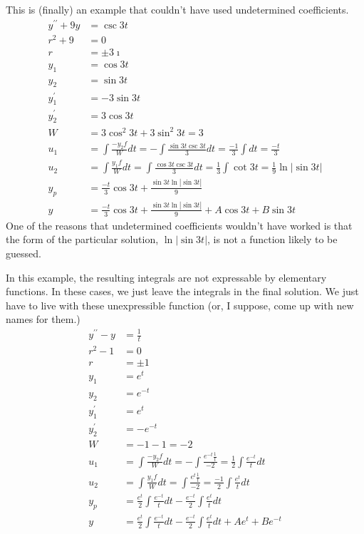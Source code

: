 \documentclass[fleqn,letterpaper]{report}
\begin{document}
\begin{example}
This is (finally) an example that couldn't have used
undetermined coefficients.
\begin{align*}
y^{\prime\prime} + 9y & = \csc 3t \\
r^2 + 9 & = 0 \\
r & = \pm 3\imath \\
y_1 & = \cos 3t \\
y_2 & = \sin 3t \\
y_1^\prime & = -3 \sin 3t \\
y_2^\prime & = 3 \cos 3t \\
W & = 3\cos^2 3t + 3 \sin^2 3t = 3\\
u_1 & = \int \frac{-y_2 f}{W} dt = -\int \frac{\sin 3t \csc
3t}{3} dt = \frac{-1}{3} \int dt = \frac{-t}{3} \\
u_2 & = \int \frac{y_1 f}{W} dt = \int \frac{\cos3t \csc 3t}{3}
dt = \frac{1}{3} \int \cot 3t = \frac{1}{9} \ln |\sin 3t| \\
y_p & = \frac{-t}{3} \cos 3t + \frac{\sin 3t \ln |\sin 3t|}{9}
\\
y & = \frac{-t}{3} \cos 3t + \frac{\sin 3t \ln |\sin 3t|}{9} + A
\cos 3t + B \sin 3t
\end{align*}
One of the reasons that undetermined coefficients wouldn't
have worked is that the form of the particular solution, $\ln
|\sin 3t|$, is not a function likely to be guessed.
\end{example}

\begin{example}
In this example, the resulting integrals are not
expressable by elementary functions. In these cases, we just
leave the integrals in the final solution. We just have to
live with these unexpressible function (or, I suppose, come up
with new names for them.) 
\begin{align*}
y^{\prime\prime} - y & = \frac{1}{t} \\
r^2 - 1 & = 0 \\
r & = \pm 1\\
y_1 & = e^t \\
y_2 & = e^{-t} \\
y_1^\prime & = e^t \\
y_2^\prime & = - e^{-t} \\ 
W & = -1 -1 = -2 \\
u_1 & = \int \frac{-y_2 f}{W} dt = -\int \frac{ e^{-t}
\frac{1}{t}}{-2} = \frac{1}{2} \int \frac{e^{-t}}{t} dt \\
u_2 & = \int \frac{y_1 f}{W} dt = \int \frac{ e^t
\frac{1}{t}}{-2} = \frac{-1}{2} \int \frac{e^t}{t} dt \\
y_p & = \frac{e^t}{2} \int \frac{e^{-t}}{t} dt -
\frac{e^{-t}}{2} \int \frac{e^t}{t} dt \\
y & = \frac{e^t}{2} \int \frac{e^{-t}}{t} dt -
\frac{e^{-t}}{2} \int \frac{e^t}{t} dt + Ae^t + Be^{-t}
\end{align*}
\end{example}
\end{document}
